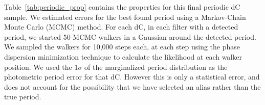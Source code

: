 \documentclass[twocolumn]{aastex631}
\begin{document}






Table~\ref{tab:periodic_prop} contains the properties for this final periodic dC sample. We estimated errors for the best found period using a Markov-Chain Monte Carlo (MCMC) method. For each dC, in each filter with a detected period, we started 50 MCMC walkers in a Gaussian around the detected period. We sampled the walkers for 10,000 steps each, at each step using the phase dispersion minimization technique \citep{Stellingwerf1978} to calculate the likelihood at each walker position. We used the 1$\sigma$ of the marginalized period distribution as the photometric period error for that dC.  However this is only a statistical error, and does not account for the possibility that we have selected an alias rather than the true period. 
\end{document}
